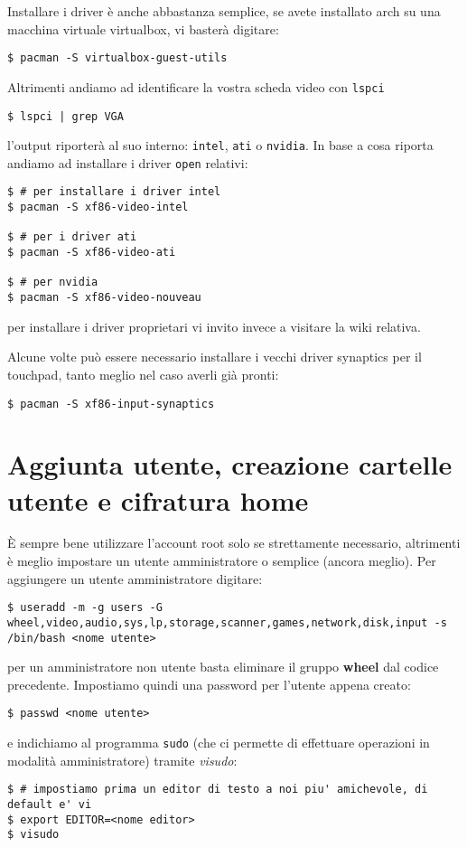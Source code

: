 \documentclass[twoside,italian]{book}
\newcommand{\code}[1]{\texttt{#1}}
\begin{document}
    Installare i driver è anche abbastanza semplice, se avete installato arch su una macchina virtuale virtualbox, vi basterà digitare: 
    \begin{lstlisting}
$ pacman -S virtualbox-guest-utils
    \end{lstlisting}
    Altrimenti andiamo ad identificare la vostra scheda video con \code{lspci} 
    \begin{lstlisting}
$ lspci | grep VGA
    \end{lstlisting}
    l'output riporterà al suo interno: \code{intel}, \code{ati} o \code{nvidia}. In base a cosa riporta andiamo ad installare i driver \code{open} relativi:
\begin{lstlisting}
$ # per installare i driver intel
$ pacman -S xf86-video-intel

$ # per i driver ati
$ pacman -S xf86-video-ati

$ # per nvidia
$ pacman -S xf86-video-nouveau
\end{lstlisting}

    per installare i driver proprietari vi invito invece a visitare la wiki relativa.
    
    Alcune volte può essere necessario installare i vecchi driver synaptics per il touchpad, tanto meglio nel caso averli già pronti:
    \begin{lstlisting}
$ pacman -S xf86-input-synaptics
    \end{lstlisting}

\section{Aggiunta utente, creazione cartelle utente e cifratura home }

    È sempre bene utilizzare l'account root solo se strettamente necessario, altrimenti è meglio impostare un utente amministratore o semplice (ancora meglio).
    Per aggiungere un utente amministratore digitare:
    \begin{lstlisting}
$ useradd -m -g users -G wheel,video,audio,sys,lp,storage,scanner,games,network,disk,input -s /bin/bash <nome utente>
    \end{lstlisting}
    per un amministratore non utente basta eliminare il gruppo \textbf{wheel} dal codice precedente.
    Impostiamo quindi una password per l'utente appena creato: 
    \begin{lstlisting}
$ passwd <nome utente>
    \end{lstlisting}
    e indichiamo al programma \code{sudo} (che ci permette di effettuare operazioni in modalità amministratore) tramite \textit{visudo}:
\begin{lstlisting}
$ # impostiamo prima un editor di testo a noi piu' amichevole, di default e' vi
$ export EDITOR=<nome editor>
$ visudo
\end{lstlisting}
\end{document}
